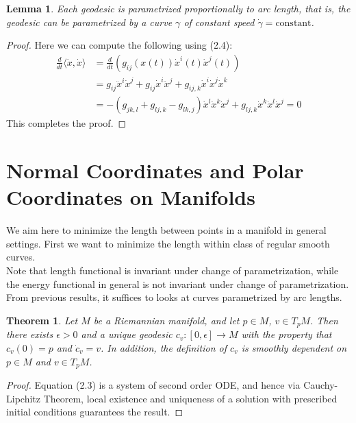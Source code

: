 \documentclass[11pt]{book}
\theoremstyle{break}
\theoremstyle{break}
\newtheorem{thm}{Theorem}[section]
\newtheorem{lem}{Lemma}[thm]
\begin{document}
\begin{lem}
Each geodesic is parametrized proportionally to arc length, that is, the geodesic can be parametrized by a curve $\gamma$ of constant speed $\dot{\gamma} = \text{constant}$.  
\end{lem}
\begin{proof}
Here we can compute the following using (2.4):
\begin{align*}
\frac{d}{dt}\langle\dot{x},\dot{x}\rangle &= \frac{d}{dt}\left( g_{ij}(x(t)) \dot{x}^i(t) \dot{x}^j(t)\right) \\
&= g_{ij}\ddot{x}^i \dot{x}^j + g_{ij}\dot{x}^i\ddot{x}^j + g_{ij,k}\dot{x}^i\dot{x}^j\dot{x}^k\\
&= -(g_{jk,l}+g_{lj,k}-g_{lk,j})\dot{x}^l\dot{x}^k\dot{x}^j + g_{lj,k}\dot{x}^k\dot{x}^l\dot{x}^j =0
\end{align*} 
This completes the proof.
\end{proof}

\newpage
\section[Normal Coordinates and Polar Coordinates on Manifolds]{\color{red}Normal Coordinates and Polar Coordinates on Manifolds\color{black}}
We aim here to minimize the length between points in a manifold in general settings. First we want to minimize the length within class of regular smooth curves.\\

Note that length functional is invariant under change of parametrization, while the energy functional in general is not invariant under change of parametrization. From previous results, it suffices to looks at curves parametrized by arc lengths. 

\begin{thm}
Let $M$ be a Riemannian manifold, and let $p \in M$, $v \in T_pM$. Then there exists $\epsilon>0$ and a unique geodesic $c_v:[0,\epsilon]\to M$ with the property that $c_v(0) = p$ and $\dot{c}_v = v$. In addition, the definition of $c_v$ is smoothly dependent on $p\in M$ and $v\in T_pM$. 
\end{thm}
\begin{proof}
Equation (2.3) is a system of second order ODE, and hence via Cauchy-Lipchitz Theorem, local existence and uniqueness of a solution with prescribed initial conditions guarantees the result. 
\end{proof}
\end{document}
